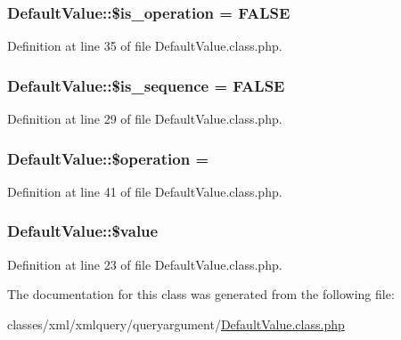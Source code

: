 \subsubsection[{\texorpdfstring{\$is\+\_\+operation}{$is_operation}}]{\setlength{\rightskip}{0pt plus 5cm}Default\+Value\+::\$is\+\_\+operation = F\+A\+L\+SE}\hypertarget{classDefaultValue_ae01855465814b8be26de7bd0b33b6778}{}\label{classDefaultValue_ae01855465814b8be26de7bd0b33b6778}


Definition at line 35 of file Default\+Value.\+class.\+php.

\subsubsection[{\texorpdfstring{\$is\+\_\+sequence}{$is_sequence}}]{\setlength{\rightskip}{0pt plus 5cm}Default\+Value\+::\$is\+\_\+sequence = F\+A\+L\+SE}\hypertarget{classDefaultValue_a7ad2c3e04c79053b6299c0fa0e35389e}{}\label{classDefaultValue_a7ad2c3e04c79053b6299c0fa0e35389e}


Definition at line 29 of file Default\+Value.\+class.\+php.

\subsubsection[{\texorpdfstring{\$operation}{$operation}}]{\setlength{\rightskip}{0pt plus 5cm}Default\+Value\+::\$operation = \textquotesingle{}\textquotesingle{}}\hypertarget{classDefaultValue_a0b0e52103637bbb5ea0fdedcb0672fcd}{}\label{classDefaultValue_a0b0e52103637bbb5ea0fdedcb0672fcd}


Definition at line 41 of file Default\+Value.\+class.\+php.

\subsubsection[{\texorpdfstring{\$value}{$value}}]{\setlength{\rightskip}{0pt plus 5cm}Default\+Value\+::\$value}\hypertarget{classDefaultValue_a963ea764e6dfb5dbfe87c4b8ffd131ac}{}\label{classDefaultValue_a963ea764e6dfb5dbfe87c4b8ffd131ac}


Definition at line 23 of file Default\+Value.\+class.\+php.



The documentation for this class was generated from the following file\+:\begin{DoxyCompactItemize}
\item 
classes/xml/xmlquery/queryargument/\hyperlink{DefaultValue_8class_8php}{Default\+Value.\+class.\+php}\end{DoxyCompactItemize}
